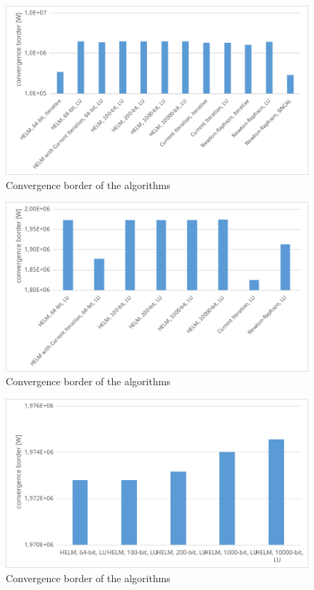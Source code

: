 \begin{figure}
	\centering
	\includegraphics[scale=0.7]{figures/convergence_border_vorstadtnetz_1}
	\caption[Comparison, convergence]{Convergence border of the algorithms}
	\label{fig:comparison_convergence_border_1}
\end{figure}

\begin{figure}
	\centering
	\includegraphics[scale=0.7]{figures/convergence_border_vorstadtnetz_2}
	\caption[Comparison, convergence]{Convergence border of the algorithms}
	\label{fig:comparison_convergence_border_2}
\end{figure}

\begin{figure}
	\centering
	\includegraphics[scale=0.7]{figures/convergence_border_vorstadtnetz_3}
	\caption[Comparison, convergence]{Convergence border of the algorithms}
	\label{fig:comparison_convergence_border_3}
\end{figure}

